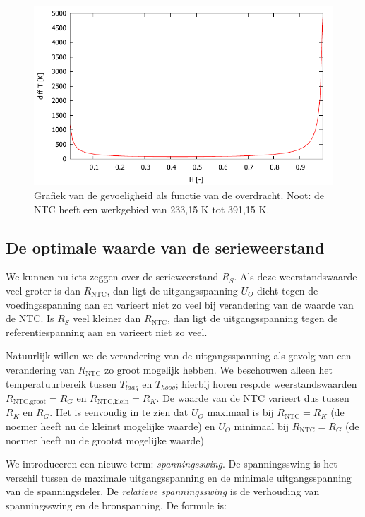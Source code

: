\documentclass[12pt,a4paper,final,twoside,fleqn]{article}
\newcommand{\rntc}{R_\text{NTC}}
\begin{document}
\begin{figure}[ht!]
\centering
\includegraphics[scale=1]{gnuplot/ntc_sensitivity_T}
\caption[Grafiek van de gevoeligheid als functie van de overdracht]{Grafiek van de gevoeligheid als functie van de overdracht. Noot:
de NTC heeft een werkgebied van 233,15 K tot 391,15 K.}
\label{fig:ntc_sensitivity_T}
\end{figure}



\subsection{De optimale waarde van de serieweerstand}
We kunnen nu iets zeggen over de serieweerstand $R_S$. Als deze weerstandswaarde
veel groter is dan $\rntc$, dan ligt de uitgangsspanning $U_O$ dicht tegen de
voedingsspanning aan en varieert niet zo veel bij verandering van de waarde van
de NTC. Is $R_S$ veel kleiner dan $\rntc$, dan ligt de uitgangsspanning tegen
de referentiespanning aan en varieert niet zo veel.

Natuurlijk willen we de verandering van de uitgangsspanning als gevolg van een
verandering van $\rntc$ zo groot mogelijk hebben. We beschouwen alleen het
temperatuurbereik tussen $T_{laag}$ en $T_{hoog}$; hierbij horen resp.\@ de
weerstandswaarden $R_\text{NTC,groot} = R_G$ en $R_\text{NTC,klein} = R_K$.
De waarde van de NTC varieert dus tussen $R_K$ en $R_G$. Het is eenvoudig in
te zien dat $U_O$ maximaal is bij $\rntc = R_K$ (de noemer heeft nu de kleinst
mogelijke waarde) en $U_O$ minimaal bij $\rntc = R_G$ (de noemer heeft nu de
grootst mogelijke waarde)

We introduceren een nieuwe term: \textsl{spanningsswing}. De spanningsswing is
het verschil tussen de maximale uitgangsspanning en de minimale uitgangsspanning
van de spanningsdeler.
De \textsl{relatieve spanningsswing} is de verhouding van spanningsswing en de
bronspanning. De formule is:
\end{document}
